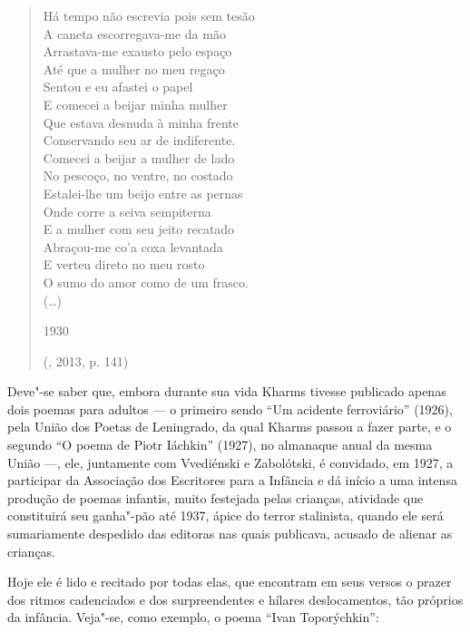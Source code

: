 \begin{verse}
Há tempo não escrevia pois sem tesão\\
A caneta escorregava-me da mão\\
Arrastava-me exausto pelo espaço\\
Até que a mulher no meu regaço\\
Sentou e eu afastei o papel\\
E comecei a beijar minha mulher\\
Que estava desnuda à minha frente\\ 
Conservando seu ar de indiferente.\\
Comecei a beijar a mulher de lado\\
No pescoço, no ventre, no costado\\
Estalei-lhe um beijo entre as pernas\\
Onde corre a seiva sempiterna\\
E a mulher com seu jeito recatado\\
Abraçou-me co’a coxa levantada\\
E verteu direto no meu rosto\\
O sumo do amor como de um frasco.\\
(\ldots{})

1930

(, 2013, p. 141)
\end{verse}

Deve"-se saber que, embora durante sua vida Kharms tivesse
publicado apenas dois poemas para adultos --- o primeiro sendo
``Um acidente ferroviário'' (1926), pela União dos Poetas de
Leningrado, da qual Kharms passou a fazer parte, e o segundo
``O poema de Piotr Iáchkin'' (1927), no almanaque anual da
mesma União ---, ele, juntamente com Vvediénski e Zabolótski,
é convidado, em 1927, a participar da Associação dos Escritores
para a Infância e dá início a uma intensa produção de poemas
infantis, muito festejada pelas crianças, atividade que
constituirá seu ganha"-pão até 1937, ápice do terror stalinista,
quando ele será sumariamente despedido das editoras nas quais
publicava, acusado de alienar as crianças.

Hoje ele é lido e recitado por todas elas, que encontram em seus
versos o prazer dos ritmos cadenciados e dos surpreendentes e
hílares deslocamentos, tão próprios da infância. Veja"-se, como
exemplo, o poema ``Ivan Toporýchkin'':

